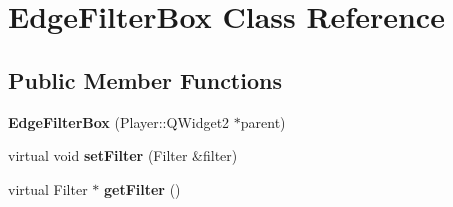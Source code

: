 \hypertarget{classEdgeFilterBox}{}\section{Edge\+Filter\+Box Class Reference}
\label{classEdgeFilterBox}
\subsection*{Public Member Functions}
\begin{DoxyCompactItemize}
\item 
\hypertarget{classEdgeFilterBox_ab37f054ac5b430a7ead1936dc4c46fdc}{}{\bfseries Edge\+Filter\+Box} (Player\+::\+Q\+Widget2 $\ast$parent)\label{classEdgeFilterBox_ab37f054ac5b430a7ead1936dc4c46fdc}

\item 
\hypertarget{classEdgeFilterBox_a09e99b0db09b8468ce7d7e0f98293ac5}{}virtual void {\bfseries set\+Filter} (Filter \&filter)\label{classEdgeFilterBox_a09e99b0db09b8468ce7d7e0f98293ac5}

\item 
\hypertarget{classEdgeFilterBox_ad7b14770615490d1445c958c79fd3adb}{}virtual Filter $\ast$ {\bfseries get\+Filter} ()\label{classEdgeFilterBox_ad7b14770615490d1445c958c79fd3adb}

\end{DoxyCompactItemize}
